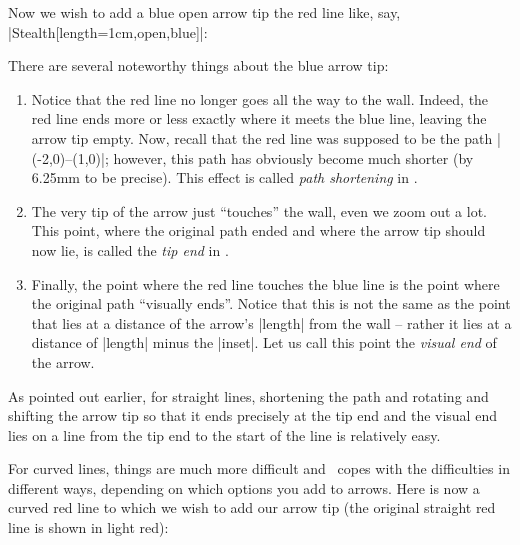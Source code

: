 Now we wish to add a blue open arrow tip the red line like, say,
|Stealth[length=1cm,open,blue]|:
%
\begin{codeexample}
\usetikzlibrary{patterns}
\def\wall{ \fill     [fill=black!50]  (1,-.5) rectangle (2,.5);
           \pattern  [pattern=bricks] (1,-.5) rectangle (2,.5);
           \draw     [line width=1pt]  (1cm+.5pt,-.5) -- ++(0,1); }
\end{codeexample}
\begin{codeexample}[preamble={\usetikzlibrary{arrows.meta}}]
\end{codeexample}

There are several noteworthy things about the blue arrow tip:
%
\begin{enumerate}
    \item Notice that the red line no longer goes all the way to the wall.
        Indeed, the red line ends more or less exactly where it meets the
        blue line, leaving the arrow tip empty. Now, recall that the red line
        was supposed to be the path |(-2,0)--(1,0)|; however, this path has
        obviously become much shorter (by 6.25mm to be precise). This effect
        is called \emph{path shortening} in \tikzname.
    \item The very tip of the arrow just ``touches'' the wall, even we zoom
        out a lot. This point, where the original path ended and where the
        arrow tip should now lie, is called the \emph{tip end} in \tikzname.
    \item Finally, the point where the red line touches the blue line is the
        point where the original path ``visually ends''. Notice that this is
        not the same as the point that lies at a distance of the arrow's
        |length| from the wall -- rather it lies at a distance of |length|
        minus the |inset|. Let us call this point the \emph{visual
    end} of the arrow.
\end{enumerate}

As pointed out earlier, for straight lines, shortening the path and rotating
and shifting the arrow tip so that it ends precisely at the tip end and the
visual end lies on a line from the tip end to the start of the line is
relatively easy.

For curved lines, things are much more difficult and \tikzname\ copes with the
difficulties in different ways, depending on which options you add to arrows.
Here is now a curved red line to which we wish to add our arrow tip (the
original straight red line is shown in light red):
%
\begin{codeexample}[]
\end{codeexample}

